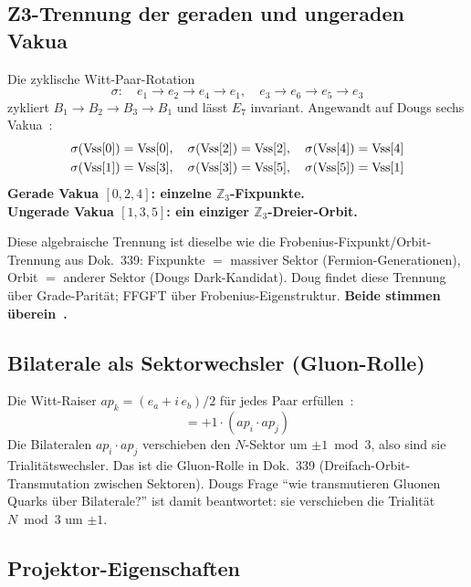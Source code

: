 \subsection{Z3-Trennung der geraden und ungeraden Vakua}

Die zyklische Witt-Paar-Rotation
\begin{equation}
  \sigma:\quad e_1{\to}e_2{\to}e_4{\to}e_1,\quad e_3{\to}e_6{\to}e_5{\to}e_3
\end{equation}
zykliert $B_1 \to B_2 \to B_3 \to B_1$ und lässt $E_7$ invariant.
Angewandt auf Dougs sechs Vakua~\BM:
\begin{align}
  &\sigma(\text{Vss}[0]) = \text{Vss}[0],\quad
   \sigma(\text{Vss}[2]) = \text{Vss}[2],\quad
   \sigma(\text{Vss}[4]) = \text{Vss}[4] \notag\\
  &\sigma(\text{Vss}[1]) = \text{Vss}[3],\quad
   \sigma(\text{Vss}[3]) = \text{Vss}[5],\quad
   \sigma(\text{Vss}[5]) = \text{Vss}[1]
\end{align}
\textbf{Gerade Vakua $[0,2,4]$: einzelne $\mathbb{Z}_3$-Fixpunkte.}\\
\textbf{Ungerade Vakua $[1,3,5]$: ein einziger $\mathbb{Z}_3$-Dreier-Orbit.}

Diese algebraische Trennung ist dieselbe wie die Frobenius-Fixpunkt/Orbit-Trennung
aus Dok.~339: Fixpunkte $=$ massiver Sektor (Fermion-Generationen),
Orbit $=$ anderer Sektor (Dougs Dark-Kandidat).
Doug findet diese Trennung über Grade-Parität; FFGFT über Frobenius-Eigenstruktur.
\textbf{Beide stimmen überein~\BM.}

\subsection{Bilaterale als Sektorwechsler (Gluon-Rolle)}

Die Witt-Raiser $ap_k = (e_a + i\,e_b)/2$ für jedes Paar erfüllen~\BM:
\begin{equation}
  [N,\; ap_i \cdot ap_j] = +1 \cdot (ap_i \cdot ap_j)
\end{equation}
Die Bilateralen $ap_i \cdot ap_j$ verschieben den $N$-Sektor um $\pm 1 \bmod 3$,
also sind sie Trialitätswechsler. Das ist die Gluon-Rolle in Dok.~339
(Dreifach-Orbit-Transmutation zwischen Sektoren). Dougs Frage
``wie transmutieren Gluonen Quarks über Bilaterale?'' ist damit beantwortet:
sie verschieben die Trialität $N \bmod 3$ um $\pm 1$.

\subsection{Projektor-Eigenschaften}

